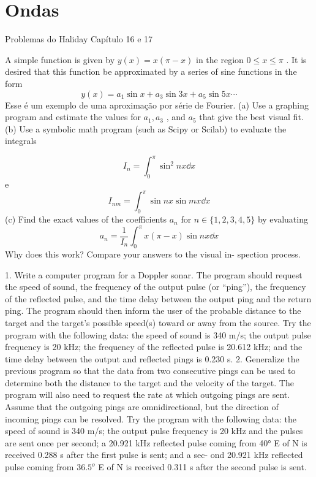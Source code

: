 \chapter{Ondas}
Problemas do Haliday Capítulo 16 e 17

A simple function is given by $y(x) = x( \pi - x)$ in the region
$0 \leqslant x \leqslant \pi$ . It is desired that this function be approximated by
a series of sine functions in the form \[y(x) = a_1  \sin x +
a_3 \sin 3x + a_5 \sin 5x \cdots\] Esse é um exemplo de uma aproximação por série de Fourier. (a) Use a graphing program and
estimate the values for $a_1 , a_3$ , and $a_5$ that give the best visual
fit. (b) Use a symbolic math program (such as Scipy or Scilab) to evaluate the integrals

\[I_n = \int_0^\pi \sin^2 nx \dd x\]
e 
\[I_{nm} = \int_0^\pi \sin nx \sin mx \dd x \]
(c) Find the exact values of the coefficients $a_n$ for
$n \in \{1, 2, 3, 4, 5\}$ by evaluating
\[ a_n = \frac{1}{I_n} \int_0^\pi x(\pi - x) \sin nx \dd x   \]
Why does this work? Compare your answers to the visual in-
spection process.

1. Write a computer program for a Doppler sonar. The program
should request the speed of sound, the frequency of the output
pulse (or “ping”), the frequency of the reflected pulse, and the
time delay between the output ping and the return ping. The
program should then inform the user of the probable distance
to the target and the target’s possible speed(s) toward or away
from the source. Try the program with the following data: the
speed of sound is 340 m/s; the output pulse frequency is
20 kHz; the frequency of the reflected pulse is 20.612 kHz;
and the time delay between the output and reflected pings is
0.230 s.
2. Generalize the previous program so that the data from two
consecutive pings can be used to determine both the distance
to the target and the velocity of the target. The program will
also need to request the rate at which outgoing pings are sent.
Assume that the outgoing pings are omnidirectional, but the
direction of incoming pings can be resolved. Try the program
with the following data: the speed of sound is 340 m/s; the
output pulse frequency is 20 kHz and the pulses are sent once
per second; a 20.921 kHz reflected pulse coming from 40° E
of N is received 0.288 s after the first pulse is sent; and a sec-
ond 20.921 kHz reflected pulse coming from $36.5^o$ E of N is
received 0.311 s after the second pulse is sent.